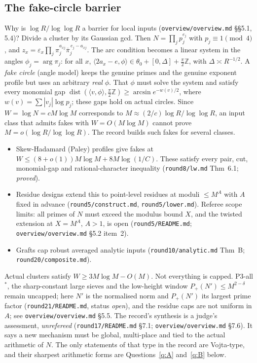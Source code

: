 \documentclass[11pt]{article}
\newcommand{\Z}{\mathbb Z}
\newcommand{\dist}{\operatorname{dist}}
\newcommand{\conj}[1]{\overline{#1}}
\newcommand{\rec}[1]{\texttt{#1}}
\begin{document}
\subsection{The fake-circle barrier}\label{sec:fakes}

Why is \(\log R/\log\log R\) a barrier for local inputs
(\rec{overview/overview.md} \S\S5.1, 5.4)?  Divide a cluster by its Gaussian
gcd.  Then \(N=\prod_jp_j^{e_j}\) with \(p_j\equiv1\pmod 4\), and
\(z_x=\varepsilon_x\prod_j\pi_j^{a_{xj}}\conj\pi_j^{\,e_j-a_{xj}}\).  The arc
condition becomes a linear system in the angles \(\phi_j=\arg\pi_j\): for all
\(x\), \(\langle2a_x-e,\phi\rangle\in\theta_0+[0,\Delta]+\frac\pi2\Z\), with
\(\Delta\asymp R^{-1/2}\).  A \emph{fake circle} (angle model) keeps the
genuine primes and the genuine exponent profile but uses an arbitrary
\emph{real} \(\phi\).  That \(\phi\) must solve the system and satisfy every
monomial gap
\(\dist(\langle v,\phi\rangle,\frac\pi2\Z)\ge\arcsin e^{-w(v)/2}\), where
\(w(v)=\sum|v_j|\log p_j\); these gaps hold on actual circles.  Since
\(W=\log N=cM\log M\) corresponds to \(M\approx(2/c)\log R/\log\log R\), an
input class that admits fakes with \(W=O(M\log M)\) cannot prove
\(M=o(\log R/\log\log R)\).  The record builds such fakes for several classes.
\begin{itemize}[leftmargin=2em]
  \item Skew-Hadamard (Paley) profiles give fakes at
    \(W\le(8+o(1))M\log M+8M\log(1/C)\).  These satisfy every pair, cut,
    monomial-gap and rational-character inequality (\rec{round8/lw.md}
    Thm~6.1; \emph{proved}).
  \item Residue designs extend this to point-level residues at moduli
    \(\le M^A\) with \(A\) fixed in advance (\rec{round5/construct.md},
    \rec{round5/lower.md}).  Referee scope limits: all primes of \(N\) must
    exceed the modulus bound \(X\), and the twisted extension at \(X=M^A\),
    \(A>1\), is open (\rec{round5/README.md}; \rec{overview/overview.md}
    \S5.2 item~2).
  \item Grafts cap robust averaged analytic inputs
    (\rec{round10/analytic.md} Thm~B; \rec{round20/composite.md}).
\end{itemize}
Actual clusters satisfy \(W\ge3M\log M-O(M)\).  Not everything is capped.
P3-all\(^*\), the sharp-constant large sieves and the low-height window
\(P_+(N')\le M^{2-\delta}\) remain uncapped; here \(N'\) is the normalised
norm and \(P_+(N')\) its largest prime factor (\rec{round21/README.md}, status
\emph{open}), and the residue caps are not uniform in \(A\); see
\rec{overview/overview.md} \S5.5.  The record's synthesis is a judge's
assessment, \emph{unrefereed} (\rec{round17/README.md} \S7.1;
\rec{overview/overview.md} \S7.6).  It says a new mechanism must be global,
multi-place and tied to the actual arithmetic of \(N\).  The only statements
of that type in the record are Vojta-type, and their sharpest arithmetic forms
are Questions~\ref{q:A} and~\ref{q:B} below.
\end{document}
